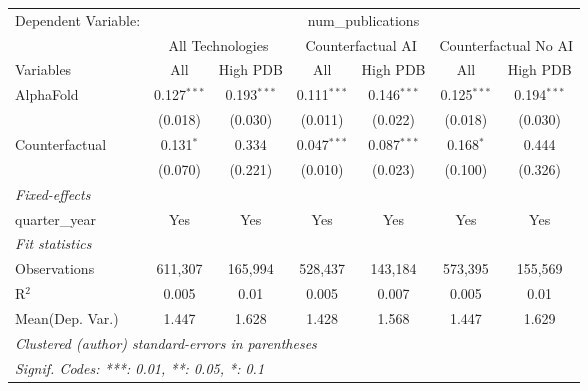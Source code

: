 \begingroup
\centering
\begin{tabular}{lcccccc}
   \tabularnewline \midrule \midrule
   Dependent Variable: & \multicolumn{6}{c}{num\_publications}\\
 & \multicolumn{2}{c}{All Technologies} & \multicolumn{2}{c}{Counterfactual AI} & \multicolumn{2}{c}{Counterfactual No AI} \\
\cmidrule(lr){1-1}\cmidrule(lr){2-3} \cmidrule(lr){4-5} \cmidrule(lr){6-7}
Variables & \multicolumn{1}{c}{All} & \multicolumn{1}{c}{High PDB} & \multicolumn{1}{c}{All} & \multicolumn{1}{c}{High PDB} & \multicolumn{1}{c}{All} & \multicolumn{1}{c}{High PDB} \\
\cmidrule(lr){1-1}\cmidrule(lr){2-2} \cmidrule(lr){3-3} \cmidrule(lr){4-4} \cmidrule(lr){5-5} \cmidrule(lr){6-6} \cmidrule(lr){7-7}
   AlphaFold      & 0.127$^{***}$ & 0.193$^{***}$ & 0.111$^{***}$ & 0.146$^{***}$ & 0.125$^{***}$ & 0.194$^{***}$\\   
                  & (0.018)       & (0.030)       & (0.011)       & (0.022)       & (0.018)       & (0.030)\\   
   Counterfactual & 0.131$^{*}$   & 0.334         & 0.047$^{***}$ & 0.087$^{***}$ & 0.168$^{*}$   & 0.444\\   
                  & (0.070)       & (0.221)       & (0.010)       & (0.023)       & (0.100)       & (0.326)\\   
   \midrule
   \emph{Fixed-effects}\\
   quarter\_year  & Yes           & Yes           & Yes           & Yes           & Yes           & Yes\\  
   \midrule
   \emph{Fit statistics}\\
   Observations   & 611,307       & 165,994       & 528,437       & 143,184       & 573,395       & 155,569\\  
   R$^2$          & 0.005         & 0.01          & 0.005         & 0.007         & 0.005         & 0.01\\  
Mean(Dep. Var.) & 1.447 & 1.628 & 1.428 & 1.568 & 1.447 & 1.629 \\
   \midrule \midrule
   \multicolumn{7}{l}{\emph{Clustered (author) standard-errors in parentheses}}\\
   \multicolumn{7}{l}{\emph{Signif. Codes: ***: 0.01, **: 0.05, *: 0.1}}\\
\end{tabular}
\par\endgroup

